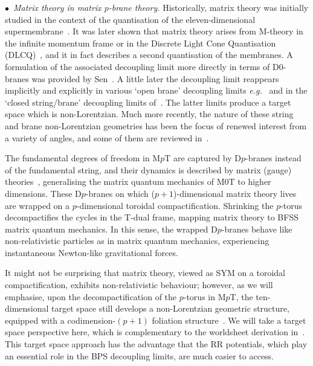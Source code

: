 \documentclass[11pt]{article}
\renewcommand{\emph}[1]{\textit{#1}}
\begin{document}
\vspace{3mm}

\noindent $\bullet$~\emph{Matrix theory in matrix $p$-brane theory.}
Historically, matrix theory was initially studied in the context of the quantisation of the eleven-dimensional supermembrane~\cite{deWit:1988wri}. It was later shown that matrix theory arises from M-theory in the infinite momentum frame \cite{Banks:1996vh} or in the Discrete Light Cone Quantisation (DLCQ)~\cite{Susskind:1997cw,Seiberg:1997ad}, and it in fact describes a second quantisation of the membranes. 
A formulation of the associated decoupling limit more directly in terms of D0-branes was provided by Sen~\cite{Sen:1997we}. A little later the decoupling limit reappears implicitly and explicitly in various `open brane' decoupling limits \emph{e.g.}~\cite{Gopakumar:2000ep, Harmark:2000ff, Hyun:2000cw} and in the `closed string/brane'  decoupling limits of~\cite{Klebanov:2000pp, Gomis:2000bd, Danielsson:2000gi, Danielsson:2000mu}.
The latter limits produce a target space which is non-Lorentzian. 
Much more recently, the nature of these string and brane non-Lorentzian geometries has been the focus of renewed interest from a variety of angles, and some of them are reviewed in~\cite{Oling:2022fft, Demulder:2023bux}.

The fundamental degrees of freedom in M$p$T are captured by D$p$-branes instead of the fundamental string, and their dynamics is described by matrix (gauge) theories~\cite{Obers:1998fb}, generalising the matrix quantum mechanics of M0T to higher dimensions. These D$p$-branes on which ($p+1$)-dimensional matrix theory lives are wrapped on a $p$-dimensional toroidal compactification. Shrinking the $p$-torus decompactifies the cycles in the T-dual frame, mapping matrix theory to BFSS matrix quantum mechanics. In this sense, the wrapped D$p$-branes behave like non-relativistic particles as in matrix quantum mechanics, experiencing instantaneous Newton-like gravitational forces. 

It might not be surprising that matrix theory, viewed as SYM 
on a toroidal compactification, exhibits non-relativistic behaviour; however, as we will emphasise, upon the decompactification of the $p$-torus in M$p$T, the ten-dimensional target space still develops a non-Lorentzian geometric structure, equipped with a codimension-$(p+1)$ foliation structure~\cite{Blair:2023noj}. We will take a target space perspective here, which is complementary to the worldsheet derivation in~\cite{Gomis:2023eav}. This target space approach has the advantage that the RR potentials, which play an essential role in the BPS decoupling limits, are much easier to access.
\end{document}
